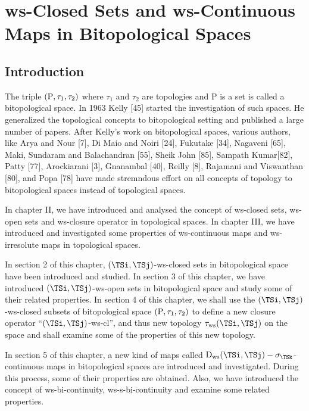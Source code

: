 \chapter{ws-Closed Sets and ws-Continuous Maps in Bitopological Spaces}
\graphicspath{{Chapter7/Chapter7Figs/EPS/}{Chapter7/Chapter7Figs/}}

\section{Introduction}\label{sec7.1}

The triple $(\mathrm{P}, \tau_1 , \tau_2)$ where $\tau_1$ and $\tau_2$ are topologies and P is a set is called a bitopological space. In 1963 Kelly [45] started the investigation of such spaces. He generalized the topological concepts to bitopological setting and published a large number of papers. After Kelly’s work on bitopological spaces, various authors, like Arya and Nour [7], Di Maio and Noiri [24], Fukutake [34], Nagaveni [65], Maki, Sundaram and Balachandran [55], Sheik John [85], Sampath Kumar[82], Patty [77], Arockiarani [3], Gnanambal [40], Reilly [8], Rajamani and Viswanthan [80], and Popa [78] have made stremndous effort on all concepts of topology to bitopological spaces instead of topological spaces.

In chapter II, we have introduced and analysed the concept of ws-closed sets, ws-open sets and ws-closure operator in topological spaces. In chapter III, we have introduced and investigated some properties of ws-continuous maps and ws-irresolute maps in topological spaces.

In section 2 of this chapter, $(\TSi,\TSj)$-ws-closed sets in bitopological space have been introduced and studied. In section 3 of this chapter, we have introduced $(\TSi, \TSj)$-ws-open sets in bitopological space and study some of their related properties. In section 4 of this chapter, we shall use the $(\TSi, \TSj)$-ws-closed subsets of bitopological space $(\mathrm{P}, \tau_1 , \tau_2)$ to define a new closure operator ``$(\TSi, \TSj)$-ws-cl'', and thus new topology $\tau_{\ws}(\TSi, \TSj)$ on the space and shall examine some of the properties of this new topology.

In section 5 of this chapter, a new kind of maps called $\clrD_{\ws} (\TSi, \TSj)-\sigma_{\TSk}$-continuous maps in bitopological spaces are introduced and investigated. During this process, some of their properties are obtained. Also, we have introduced the concept of ws-bi-continuity, ws-s-bi-continuity and examine some related properties.

